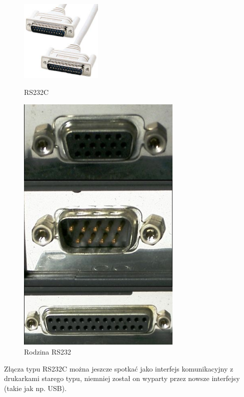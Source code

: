 \documentclass{BscUS}
\begin{document}
\begin{figure}[H]
\centering
\parbox{5cm}{
\includegraphics[width=0.35\textwidth]{./img/rs232C}
\caption{RS232C \cite{RS232C}}
\label{fig:RS232C}}
\qquad
\begin{minipage}{5cm}
\centering
\includegraphics[width=0.7\textwidth]{./img/rs232family}
\caption{Rodzina RS232 \cite{RS232family}}
\label{fig:RS232Family}
\end{minipage}
\end{figure}
\noindent Złącza typu RS232C można jeszcze spotkać jako interfejs komunikacyjny z drukarkami starego typu, niemniej został on wyparty przez nowsze interfejsy (takie jak np. USB). \\
\end{document}
